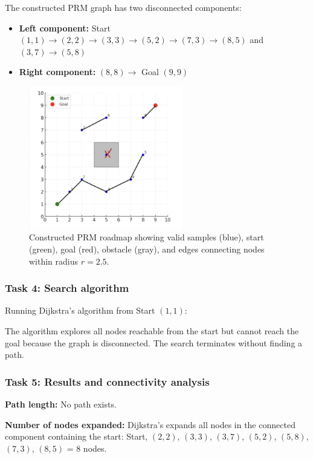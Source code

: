 \documentclass[11pt]{article}
\begin{document}
The constructed PRM graph has two disconnected components:
\begin{itemize}
    \item \textbf{Left component:} Start $(1,1) \rightarrow (2,2) \rightarrow (3,3) \rightarrow (5,2) \rightarrow (7,3) \rightarrow (8,5)$ and $(3,7) \rightarrow (5,8)$
    \item \textbf{Right component:} $(8,8) \rightarrow$ Goal $(9,9)$
\end{itemize}

\begin{figure}[h]
    \centering
    \includegraphics[width=0.6\textwidth]{roadmapimg.png}
    \caption{Constructed PRM roadmap showing valid samples (blue), start (green), goal (red), obstacle (gray), and edges connecting nodes within radius $r = 2.5$.}
    \label{fig:prm_roadmap}
\end{figure}


\subsubsection{Task 4: Search algorithm}

Running Dijkstra's algorithm from Start $(1,1)$:

The algorithm explores all nodes reachable from the start but cannot reach the goal because the graph is disconnected. The search terminates without finding a path.

\subsubsection{Task 5: Results and connectivity analysis}

\textbf{Path length:} No path exists.

\textbf{Number of nodes expanded:} Dijkstra's expands all nodes in the connected component containing the start: Start, $(2,2)$, $(3,3)$, $(3,7)$, $(5,2)$, $(5,8)$, $(7,3)$, $(8,5)$ = 8 nodes.
\end{document}
